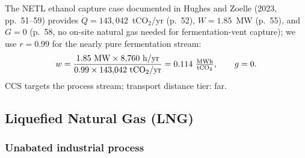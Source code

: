 \documentclass[11pt]{article}
\newcommand{\cotwo}{\ensuremath{\mathrm{CO_2}}}
\begin{document}
The NETL ethanol capture case documented in Hughes and Zoelle (2023, pp.~51--59) provides $\dot{Q} = 143{,}042$~t\cotwo{}/yr (p.~52), $W = 1.85$~MW (p.~55), and $G = 0$ (p.~58, no on-site natural gas needed for fermentation-vent capture); we use $r = 0.99$ for the nearly pure fermentation stream:
%
\[
  w = \frac{1.85~\text{MW} \times 8{,}760~\text{h/yr}}{0.99 \times 143{,}042~\text{t\cotwo{}/yr}} = 0.114~\tfrac{\text{MWh}}{\text{t\cotwo{}}}, \qquad g = 0.
\]
%
CCS targets the process stream; transport distance tier: far.

\subsection{Liquefied Natural Gas (LNG)}
\label{sec:const_lng}

\subsubsection{Unabated industrial process}
\end{document}
